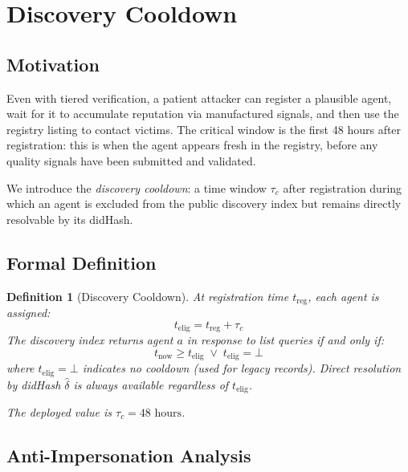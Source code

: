 \documentclass[conference]{IEEEtran}
\newtheorem{definition}{Definition}
\begin{document}
\section{Discovery Cooldown}
\label{sec:cooldown}

\subsection{Motivation}

Even with tiered verification, a patient attacker can
register a plausible agent, wait for it to accumulate
reputation via manufactured signals, and then use the
registry listing to contact victims. The critical window is
the first 48 hours after registration: this is when the
agent appears fresh in the registry, before any quality
signals have been submitted and validated.

We introduce the \emph{discovery cooldown}: a time window
$\tau_c$ after registration during which an agent is
excluded from the public discovery index but remains
directly resolvable by its didHash.

\subsection{Formal Definition}

\begin{definition}[Discovery Cooldown]
\label{def:cooldown}
At registration time $t_{\text{reg}}$, each agent is
assigned:
\begin{equation}
  t_{\text{elig}} = t_{\text{reg}} + \tau_c
  \label{eq:eligibility}
\end{equation}
The discovery index returns agent $a$ in response to list
queries if and only if:
\begin{equation}
  t_{\text{now}} \geq t_{\text{elig}}
  \;\vee\;
  t_{\text{elig}} = \bot
  \label{eq:discovery_gate}
\end{equation}
where $t_{\text{elig}} = \bot$ indicates no cooldown
(used for legacy records). Direct resolution by didHash
$\hat{\delta}$ is always available regardless of
$t_{\text{elig}}$.

The deployed value is $\tau_c = 48\text{ hours}$.
\end{definition}

\subsection{Anti-Impersonation Analysis}
\end{document}
